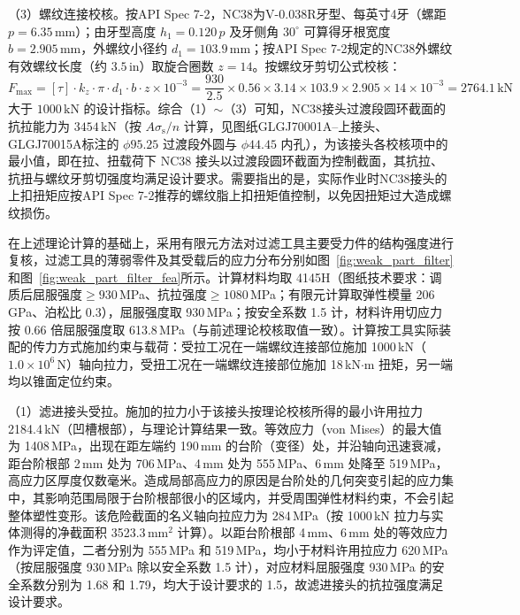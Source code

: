 （3）螺纹连接校核。按API Spec 7-2，NC38为V-0.038R牙型、每英寸4牙（螺距 $p = 6.35\,\text{mm}$）；由牙型高度 $h_1 = 0.120\,p$ 及牙侧角 $30^\circ$ 可算得牙根宽度 $b = 2.905\,\text{mm}$，外螺纹小径约 $d_1 = 103.9\,\text{mm}$；按API Spec 7-2规定的NC38外螺纹有效螺纹长度（约 $3.5\,\text{in}$）取旋合圈数 $z = 14$。按螺纹牙剪切公式校核：
\begin{equation}
    F_{\max} = [\tau] \cdot k_z \cdot \pi \cdot d_1 \cdot b \cdot z \times 10^{-3}
             = \frac{930}{2.5} \times 0.56 \times 3.14 \times 103.9 \times 2.905 \times 14 \times 10^{-3} = 2764.1\,\text{kN}
\end{equation}
大于 $1000\,\text{kN}$ 的设计指标。综合（1）$\sim$（3）可知，NC38接头过渡段圆环截面的抗拉能力为 $3454\,\text{kN}$（按 $A\sigma_{\mathrm{s}}/n$ 计算，见图纸GLGJ70001A--上接头、GLGJ70015A标注的 $\phi 95.25$ 过渡段外圆与 $\phi 44.45$ 内孔），为该接头各校核项中的最小值，即在拉、扭载荷下 NC38 接头以过渡段圆环截面为控制截面，其抗拉、抗扭与螺纹牙剪切强度均满足设计要求。需要指出的是，实际作业时NC38接头的上扣扭矩应按API Spec 7-2推荐的螺纹脂上扣扭矩值控制，以免因扭矩过大造成螺纹损伤。


在上述理论计算的基础上，采用有限元方法对过滤工具主要受力件的结构强度进行复核，过滤工具的薄弱零件及其受载后的应力分布分别如图~\ref{fig:weak_part_filter}和图~\ref{fig:weak_part_filter_fea}所示。计算材料均取 4145H（图纸技术要求：调质后屈服强度$\ge 930$\,MPa、抗拉强度$\ge 1080$\,MPa；有限元计算取弹性模量 206\,GPa、泊松比 0.3），屈服强度取 930\,MPa；按安全系数 1.5 计，材料许用切应力按 0.66 倍屈服强度取 613.8\,MPa（与前述理论校核取值一致）。计算按工具实际装配的传力方式施加约束与载荷：受拉工况在一端螺纹连接部位施加 1000\,kN（\(1.0\times10^{6}\)\,N）轴向拉力，受扭工况在一端螺纹连接部位施加 18\,kN$\cdot$m 扭矩，另一端均以锥面定位约束。

（1）滤进接头受拉。施加的拉力小于该接头按理论校核所得的最小许用拉力 2184.4\,kN（凹槽根部），与理论计算结果一致。等效应力（von Mises）的最大值为 1408\,MPa，出现在距左端约 190\,mm 的台阶（变径）处，并沿轴向迅速衰减，距台阶根部 2\,mm 处为 706\,MPa、4\,mm 处为 555\,MPa、6\,mm 处降至 519\,MPa，高应力区厚度仅数毫米。造成局部高应力的原因是台阶处的几何突变引起的应力集中，其影响范围局限于台阶根部很小的区域内，并受周围弹性材料约束，不会引起整体塑性变形。该危险截面的名义轴向拉应力为 284\,MPa（按 1000\,kN 拉力与实体测得的净截面积 3523.3\,mm$^{2}$ 计算）。以距台阶根部 4\,mm、6\,mm 处的等效应力作为评定值，二者分别为 555\,MPa 和 519\,MPa，均小于材料许用拉应力 620\,MPa（按屈服强度 930\,MPa 除以安全系数 1.5 计），对应材料屈服强度 930\,MPa 的安全系数分别为 1.68 和 1.79，均大于设计要求的 1.5，故滤进接头的抗拉强度满足设计要求。

